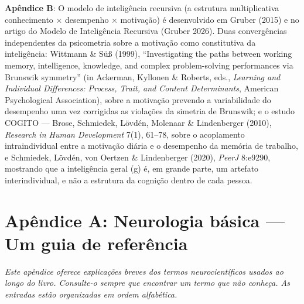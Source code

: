 \documentclass[11pt, twoside, openright]{book}
\begin{document}
\textbf{Apêndice B}: O modelo de inteligência recursiva (a estrutura multiplicativa conhecimento × desempenho × motivação) é desenvolvido em Gruber (2015) e no artigo do Modelo de Inteligência Recursiva (Gruber 2026). Duas convergências independentes da psicometria sobre a motivação como constitutiva da inteligência: Wittmann \& Süß (1999), ``Investigating the paths between working memory, intelligence, knowledge, and complex problem-solving performances via Brunswik symmetry'' (in Ackerman, Kyllonen \& Roberts, eds., \textit{Learning and Individual Differences: Process, Trait, and Content Determinants}, American Psychological Association), sobre a motivação prevendo a variabilidade do desempenho uma vez corrigidas as violações da simetria de Brunswik; e o estudo COGITO --- Brose, Schmiedek, Lövdén, Molenaar \& Lindenberger (2010), \textit{Research in Human Development} 7(1), 61--78, sobre o acoplamento intraindividual entre a motivação diária e o desempenho da memória de trabalho, e Schmiedek, Lövdén, von Oertzen \& Lindenberger (2020), \textit{PeerJ} 8:e9290, mostrando que a inteligência geral (g) é, em grande parte, um artefato interindividual, e não a estrutura da cognição dentro de cada pessoa.


\chapter*{Apêndice A: Neurologia básica --- Um guia de referência}

\textit{Este apêndice oferece explicações breves dos termos neurocientíficos usados ao longo do livro. Consulte-o sempre que encontrar um termo que não conheça. As entradas estão organizadas em ordem alfabética.}
\end{document}
